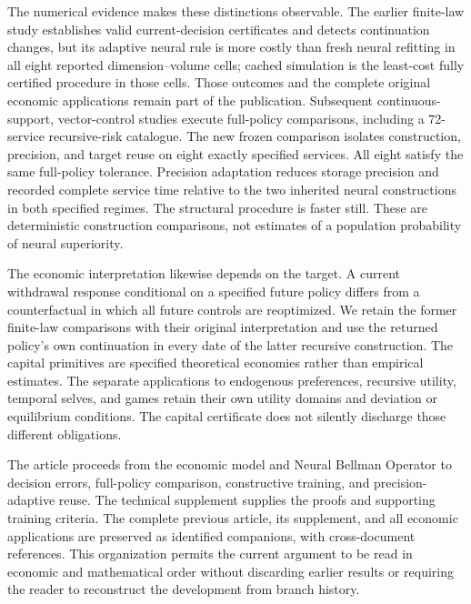 The numerical evidence makes these distinctions observable. The earlier
finite-law study establishes valid current-decision certificates and detects
continuation changes, but its adaptive neural rule is more costly than fresh
neural refitting in all eight reported dimension--volume cells; cached
simulation is the least-cost fully certified procedure in those cells. Those
outcomes and the complete original economic applications remain part of the
publication. Subsequent continuous-support, vector-control studies execute
full-policy comparisons, including a 72-service recursive-risk catalogue.
The new frozen comparison isolates construction, precision, and target reuse
on eight exactly specified services. All eight satisfy the same full-policy
tolerance. Precision adaptation reduces storage precision and recorded
complete service time relative to the two inherited neural constructions
in both specified regimes. The structural procedure is faster still.
These are deterministic construction comparisons, not estimates of a
population probability of neural superiority.

The economic interpretation likewise depends on the target. A current
withdrawal response conditional on a specified future policy differs from
a counterfactual in which all future controls are reoptimized. We retain
the former finite-law comparisons with their original interpretation and
use the returned policy's own continuation in every date of the latter
recursive construction. The capital primitives are specified theoretical
economies rather than empirical estimates. The separate applications to
endogenous preferences, recursive utility, temporal selves, and games retain
their own utility domains and deviation or equilibrium conditions. The
capital certificate does not silently discharge those different obligations.

The article proceeds from the economic model and Neural Bellman Operator
to decision errors, full-policy comparison, constructive training, and
precision-adaptive reuse. The technical supplement supplies the proofs and
supporting training criteria. The complete previous article, its supplement,
and all economic applications are preserved as identified companions, with
cross-document references. This organization permits the current argument
to be read in economic and mathematical order without discarding earlier
results or requiring the reader to reconstruct the development from branch
history.
